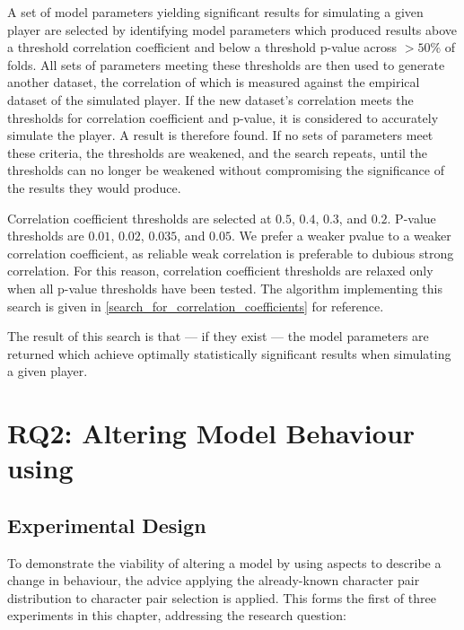 A set of model parameters yielding significant results for simulating a given
player are selected by identifying model parameters which produced results above
a threshold correlation coefficient and below a threshold p-value across $>50\%$
of folds. All sets of parameters meeting these thresholds are then used to
generate another dataset, the correlation of which is measured against the
empirical dataset of the simulated player. If the new dataset's correlation
meets the thresholds for correlation coefficient and p-value, it is considered
to accurately simulate the player. A result is therefore found. If no sets of
parameters meet these criteria, the thresholds are weakened, and the search
repeats, until the thresholds can no longer be weakened without compromising the
significance of the results they would produce.

Correlation coefficient thresholds are selected at $0.5$, $0.4$, $0.3$, and
$0.2$. P-value thresholds are $0.01$, $0.02$, $0.035$, and $0.05$. We prefer a
weaker pvalue to a weaker correlation coefficient, as reliable weak correlation
is preferable to dubious strong correlation. For this reason, correlation
coefficient thresholds are relaxed only when all p-value thresholds have been
tested. The algorithm implementing this search is given in
\cref{search_for_correlation_coefficients} for reference.

The result of this search is that --- if they exist --- the model parameters are
returned which achieve optimally statistically significant results when
simulating a given player.



\section{RQ2: Altering Model Behaviour using \AspectOrientation}
\label{sec:rq2}

\subsection{Experimental Design}

To demonstrate the viability of altering a model by using aspects to describe a
change in behaviour, the advice applying the already-known character pair
distribution to character pair selection is applied. This forms the first of
three experiments in this chapter, addressing the research question:

\begin{researchquestion}
\rqtwo{}
\end{researchquestion}

